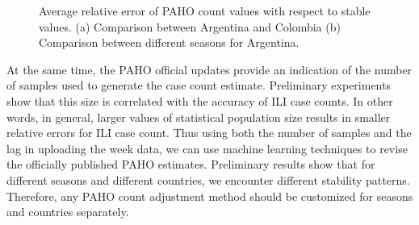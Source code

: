 \begin{figure}[h]
  \captionsetup{font=scriptsize}
  \centering
{}
\hspace{1em}
  \scriptsize
\caption{
  \label{fig:relerrors:all}
  Average relative error of PAHO count values with respect to stable values.
  (a) Comparison between Argentina and Colombia (b) Comparison between different 
  seasons for Argentina.}
  \vspace{-1em}
\end{figure}



At the same time, the PAHO official updates provide an indication of the number of samples
used to generate the case count estimate. Preliminary experiments show that
this size is correlated with the accuracy of ILI case counts. In other words,
in general, larger values of statistical population size results in smaller
relative errors for ILI case count. Thus using both the number of samples and the lag in 
uploading the week data, we can use machine learning techniques to revise the officially 
published PAHO estimates. Preliminary results
show that for different seasons and different countries, we encounter different
stability patterns. Therefore, any PAHO count adjustment method should be
customized for seasons and countries separately. 

